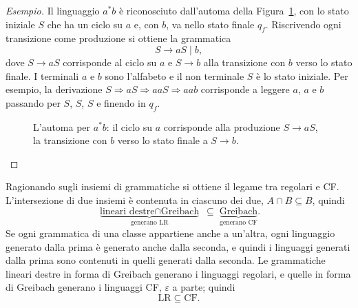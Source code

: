 \documentclass[a4paper, 11pt, oneside]{book}
\theoremstyle{formale}
\newenvironment{esempio}
    {\begin{proof}[\textit{Esempio}]\renewcommand{\qedsymbol}{$\diamond$}}
    {\end{proof}}
\begin{document}
    \begin{esempio}
        Il linguaggio $a^* b$ \`e riconosciuto dall'automa della
        Figura~\ref{fig:grammatica-regolare}, con lo stato iniziale $S$ che ha un ciclo su
        $a$ e, con $b$, va nello stato finale $q_f$. Riscrivendo ogni transizione come
        produzione si ottiene la grammatica
        \begin{equation*}
            S \to aS \mid b,
        \end{equation*}
        dove $S \to aS$ corrisponde al ciclo su $a$ e $S \to b$ alla transizione con $b$
        verso lo stato finale. I terminali $a$ e $b$ sono l'alfabeto e il non terminale
        $S$ \`e lo stato iniziale. Per esempio, la derivazione
        $S \Rightarrow aS \Rightarrow aaS \Rightarrow aab$ corrisponde a leggere $a$, $a$
        e $b$ passando per $S$, $S$, $S$ e finendo in $q_f$.

        \begin{figure}[H]
            \centering
            \caption{L'automa per $a^* b$: il ciclo su $a$ corrisponde alla produzione
                $S \to aS$, la transizione con $b$ verso lo stato finale a $S \to b$.}
            \label{fig:grammatica-regolare}
        \end{figure}
    \end{esempio}

    Ragionando sugli insiemi di grammatiche si ottiene il legame tra regolari e CF.
    L'intersezione di due insiemi \`e contenuta in ciascuno dei due,
    $A \cap B \subseteq B$, quindi
    \begin{equation*}
        \underbrace{\text{lineari destre} \cap \text{Greibach}}_{\text{generano LR}}
        \;\subseteq\;
        \underbrace{\text{Greibach}}_{\text{generano CF}}.
    \end{equation*}
    Se ogni grammatica di una classe appartiene anche a un'altra, ogni linguaggio
    generato dalla prima \`e generato anche dalla seconda, e quindi i linguaggi generati
    dalla prima sono contenuti in quelli generati dalla seconda. Le grammatiche lineari
    destre
    in forma di Greibach generano i linguaggi regolari, e quelle in forma di Greibach
    generano i linguaggi CF, $\varepsilon$ a parte; quindi
    \begin{equation*}
        \mathrm{LR} \subseteq \text{CF}.
    \end{equation*}
\end{document}
